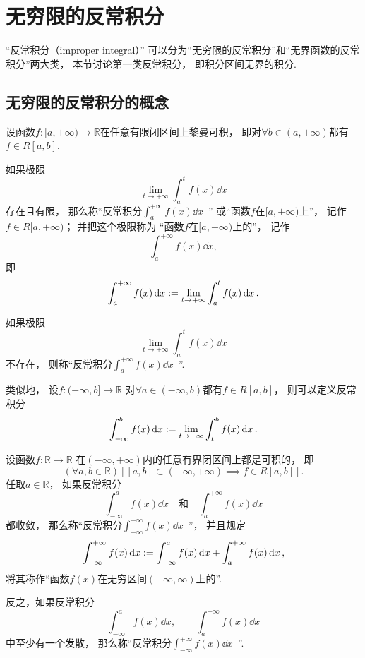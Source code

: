 \section{无穷限的反常积分}
“反常积分（improper integral）”
可以分为“无穷限的反常积分”和“无界函数的反常积分”两大类，
本节讨论第一类反常积分，
即积分区间无界的积分.

\subsection{无穷限的反常积分的概念}
\begin{definition}\label{definition:定积分.无穷限的反常积分的定义1}
设函数\(f\colon[a,+\infty)\to\mathbb{R}\)在任意有限闭区间上黎曼可积，
即对\(\forall b\in(a,+\infty)\)都有\(f \in R[a,b]\).

如果极限\[
	\lim_{t \to +\infty} \int_a^t f(x) \dd{x}
\]存在且有限，
那么称“反常积分\(\int_a^{+\infty} f(x) \dd{x}\)~”
或“函数\(f\)在\([a,+\infty)\)上”，
记作\(f \in R[a,+\infty)\)；
并把这个极限称为
“函数\(f\)在\([a,+\infty)\)上的”，
记作\[
	\int_a^{+\infty} f(x) \dd{x},
\]
即\[
	\int_a^{+\infty} f(x) \dd{x}
	:=
	\lim_{t \to +\infty} \int_a^t f(x) \dd{x}.
\]

如果极限\[
	\lim_{t \to +\infty} \int_a^t f(x) \dd{x}
\]不存在，
则称“反常积分\(\int_a^{+\infty} f(x) \dd{x}\)~”.
\end{definition}

类似地，
设\(f\colon(-\infty,b]\to\mathbb{R}\)
对\(\forall a\in(-\infty,b)\)都有\(f \in R[a,b]\)，
则可以定义反常积分\[
	\int_{-\infty}^b f(x) \dd{x}
	:=
	\lim_{t \to -\infty} \int_t^b f(x) \dd{x}.
\]

\begin{definition}\label{definition:定积分.无穷限的反常积分的定义3}
设函数\(f\colon\mathbb{R}\to\mathbb{R}\)
在\((-\infty,+\infty)\)内的任意有界闭区间上都是可积的，
即\[
	(\forall a,b\in\mathbb{R})
	[
		[a,b]\subset(-\infty,+\infty)
		\implies
		f \in R[a,b]
	].
\]
任取\(a\in\mathbb{R}\)，
如果反常积分\[
	\int_{-\infty}^a f(x) \dd{x}
	\quad\text{和}\quad
	\int_a^{+\infty} f(x) \dd{x}
\]都收敛，
那么称“反常积分\(\int_{-\infty}^{+\infty} f(x) \dd{x}\)~”，
并且规定\[
	\int_{-\infty}^{+\infty} f(x) \dd{x}
	:=
	\int_{-\infty}^a f(x) \dd{x} + \int_a^{+\infty} f(x) \dd{x},
\]
将其称作“函数\(f(x)\)在无穷区间\((-\infty,\infty)\)上的”.

反之，如果反常积分\[
	\int_{-\infty}^a f(x) \dd{x}, \qquad
	\int_a^{+\infty} f(x) \dd{x}
\]中至少有一个发散，
那么称“反常积分\(\int_{-\infty}^{+\infty} f(x) \dd{x}\)~”.
\end{definition}

